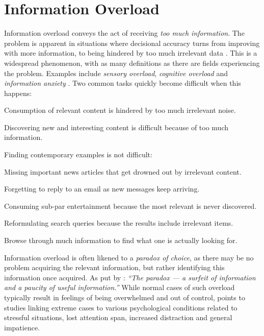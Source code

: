 \section{Information Overload}

Information overload conveys the act of receiving \emph{too much information}. 
The problem is apparent in situations where decisional accuracy turns from improving with more information, 
to being hindered by too much irrelevant data \cite[p13]{Bjorkoy2010d}. 
This is a widespread phenomenon, with as many definitions as there are fields experiencing the problem. 
Examples include \emph{sensory overload}, \emph{cognitive overload} and \emph{information anxiety} \cite[p2]{Eppler2004}.
Two common tasks quickly become difficult when this happens:

\begin{enumerate*}
  \item Consumption of relevant content is hindered by too much irrelevant noise.
  \item Discovering new and interesting content is difficult because of too much information.
\end{enumerate*}

\noindent
Finding contemporary examples is not difficult:

\begin{itemize*}
  \item Missing important news articles that get drowned out by irrelevant content.
  \item Forgetting to reply to an email as new messages keep arriving.
  \item Consuming sub-par entertainment because the most relevant is never discovered.
  \item Reformulating search queries because the results include irrelevant items.
  \item Browse through much information to find what one is actually looking for.
\end{itemize*}

Information overload is often likened to a \emph{paradox of choice}, as there may be no problem acquiring the relevant information, 
but rather identifying this information once acquired. As put by \cite[p6]{Edmunds2000}: 
\emph{``The paradox --- a surfeit of information and a paucity of useful information.''}
While normal cases of such overload typically result in feelings of being overwhelmed and out of control, 
\citet[p5]{Bawden2008} points to studies linking extreme cases to various psychological conditions 
related to stressful situations, lost attention span, increased distraction and general impatience.

